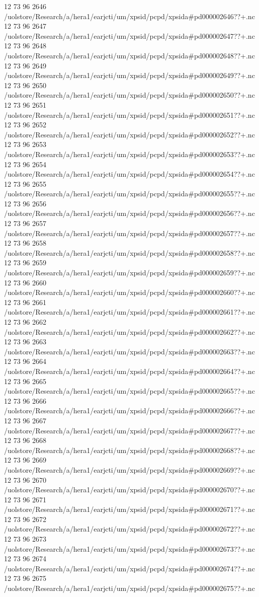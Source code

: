12 73 96
2646
/uolstore/Research/a/hera1/earjcti/um/xpsid/pcpd/xpsida#pd000002646??+.nc
12 73 96
2647
/uolstore/Research/a/hera1/earjcti/um/xpsid/pcpd/xpsida#pd000002647??+.nc
12 73 96
2648
/uolstore/Research/a/hera1/earjcti/um/xpsid/pcpd/xpsida#pd000002648??+.nc
12 73 96
2649
/uolstore/Research/a/hera1/earjcti/um/xpsid/pcpd/xpsida#pd000002649??+.nc
12 73 96
2650
/uolstore/Research/a/hera1/earjcti/um/xpsid/pcpd/xpsida#pd000002650??+.nc
12 73 96
2651
/uolstore/Research/a/hera1/earjcti/um/xpsid/pcpd/xpsida#pd000002651??+.nc
12 73 96
2652
/uolstore/Research/a/hera1/earjcti/um/xpsid/pcpd/xpsida#pd000002652??+.nc
12 73 96
2653
/uolstore/Research/a/hera1/earjcti/um/xpsid/pcpd/xpsida#pd000002653??+.nc
12 73 96
2654
/uolstore/Research/a/hera1/earjcti/um/xpsid/pcpd/xpsida#pd000002654??+.nc
12 73 96
2655
/uolstore/Research/a/hera1/earjcti/um/xpsid/pcpd/xpsida#pd000002655??+.nc
12 73 96
2656
/uolstore/Research/a/hera1/earjcti/um/xpsid/pcpd/xpsida#pd000002656??+.nc
12 73 96
2657
/uolstore/Research/a/hera1/earjcti/um/xpsid/pcpd/xpsida#pd000002657??+.nc
12 73 96
2658
/uolstore/Research/a/hera1/earjcti/um/xpsid/pcpd/xpsida#pd000002658??+.nc
12 73 96
2659
/uolstore/Research/a/hera1/earjcti/um/xpsid/pcpd/xpsida#pd000002659??+.nc
12 73 96
2660
/uolstore/Research/a/hera1/earjcti/um/xpsid/pcpd/xpsida#pd000002660??+.nc
12 73 96
2661
/uolstore/Research/a/hera1/earjcti/um/xpsid/pcpd/xpsida#pd000002661??+.nc
12 73 96
2662
/uolstore/Research/a/hera1/earjcti/um/xpsid/pcpd/xpsida#pd000002662??+.nc
12 73 96
2663
/uolstore/Research/a/hera1/earjcti/um/xpsid/pcpd/xpsida#pd000002663??+.nc
12 73 96
2664
/uolstore/Research/a/hera1/earjcti/um/xpsid/pcpd/xpsida#pd000002664??+.nc
12 73 96
2665
/uolstore/Research/a/hera1/earjcti/um/xpsid/pcpd/xpsida#pd000002665??+.nc
12 73 96
2666
/uolstore/Research/a/hera1/earjcti/um/xpsid/pcpd/xpsida#pd000002666??+.nc
12 73 96
2667
/uolstore/Research/a/hera1/earjcti/um/xpsid/pcpd/xpsida#pd000002667??+.nc
12 73 96
2668
/uolstore/Research/a/hera1/earjcti/um/xpsid/pcpd/xpsida#pd000002668??+.nc
12 73 96
2669
/uolstore/Research/a/hera1/earjcti/um/xpsid/pcpd/xpsida#pd000002669??+.nc
12 73 96
2670
/uolstore/Research/a/hera1/earjcti/um/xpsid/pcpd/xpsida#pd000002670??+.nc
12 73 96
2671
/uolstore/Research/a/hera1/earjcti/um/xpsid/pcpd/xpsida#pd000002671??+.nc
12 73 96
2672
/uolstore/Research/a/hera1/earjcti/um/xpsid/pcpd/xpsida#pd000002672??+.nc
12 73 96
2673
/uolstore/Research/a/hera1/earjcti/um/xpsid/pcpd/xpsida#pd000002673??+.nc
12 73 96
2674
/uolstore/Research/a/hera1/earjcti/um/xpsid/pcpd/xpsida#pd000002674??+.nc
12 73 96
2675
/uolstore/Research/a/hera1/earjcti/um/xpsid/pcpd/xpsida#pd000002675??+.nc
